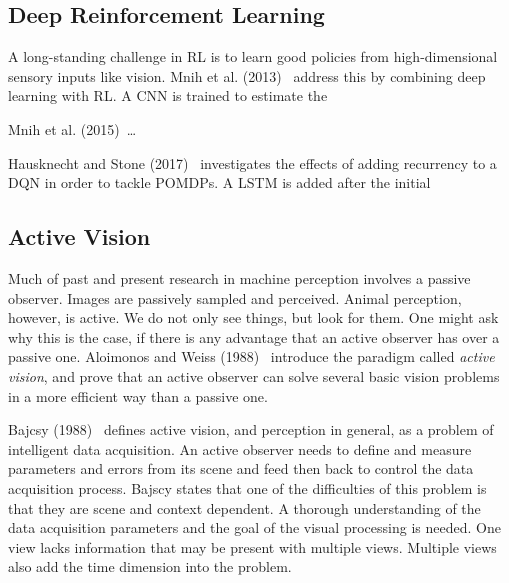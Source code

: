 \subsection{Deep Reinforcement Learning}


A long-standing challenge in RL is to learn good policies from high-dimensional sensory inputs like vision.
Mnih et al. (2013)~\cite{mnih_atari_2013} address this by combining deep learning with RL.
A CNN is trained to estimate the 

Mnih et al. (2015)~\cite{mnih_human_2015}\dots


Hausknecht and Stone (2017)~\cite{hausknecht_stone_2017} investigates the effects of adding recurrency to a DQN in order to tackle POMDPs.
A LSTM is added after the initial 


\subsection{Active Vision}
\label{sec:activevision}


Much of past and present research in machine perception involves a passive observer.
Images are passively sampled and perceived.
Animal perception, however, is active.
We do not only see things, but look for them.
One might ask why this is the case, if there is any advantage that an active observer has over a passive one.
Aloimonos and Weiss (1988)~\cite{aloimonos_active_1988} introduce the paradigm called \textit{active vision}, and prove that an active observer can solve several basic vision problems in a more efficient way than a passive one.

Bajcsy (1988)~\cite{bajcsy_1988} defines active vision, and perception in general, as a problem of intelligent data acquisition.
An active observer needs to define and measure parameters and errors from its scene and feed then back to control the data acquisition process.
Bajscy states that one of the difficulties of this problem is that they are scene and context dependent.
A thorough understanding of the data acquisition parameters and the goal of the visual processing is needed.
One view lacks information that may be present with multiple views.
Multiple views also add the time dimension into the problem.

